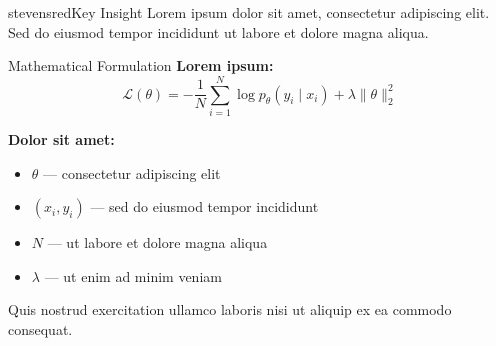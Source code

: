 \begin{colorblock}[white]{stevensred}{Key Insight}
Lorem ipsum dolor sit amet, consectetur adipiscing elit. Sed do eiusmod tempor incididunt ut labore et dolore magna aliqua.
\end{colorblock}

\begin{block}{Mathematical Formulation}
\textbf{Lorem ipsum:}
\[
\mathcal{L}(\theta) = -\frac{1}{N}\sum_{i=1}^{N} \log p_\theta(y_i \mid x_i) + \lambda \|\theta\|_2^2
\]

\textbf{Dolor sit amet:}
\begin{itemize}
    \item $\theta$ --- consectetur adipiscing elit
    \item $(x_i, y_i)$ --- sed do eiusmod tempor incididunt
    \item $N$ --- ut labore et dolore magna aliqua
    \item $\lambda$ --- ut enim ad minim veniam
\end{itemize}

\vspace{0.3em}
Quis nostrud exercitation ullamco laboris nisi ut aliquip ex ea commodo consequat.
\end{block}
